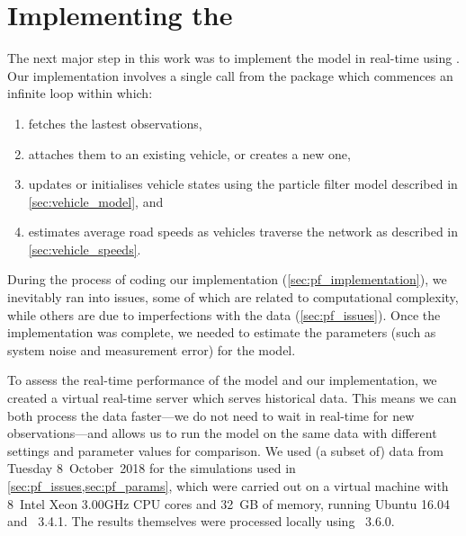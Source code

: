\section{Implementing the \rt{} \pf{}}
\label{sec:particle-filter}


The next major step in this work was to implement the model in real-time using \Cpp{}. Our implementation involves a single call from the \Rstats{} package  which commences an infinite loop within \Cpp{} which:
\begin{enumerate}
\item fetches the lastest observations,
\item attaches them to an existing vehicle, or creates a new one,
\item updates or initialises vehicle states using the particle filter model described in \cref{sec:vehicle_model}, and
\item estimates average road speeds as vehicles traverse the network as described in \cref{sec:vehicle_speeds}.
\end{enumerate}
During the process of coding our implementation (\cref{sec:pf_implementation}), we inevitably ran into issues, some of which are related to computational complexity, while others are due to imperfections with the data (\cref{sec:pf_issues}). Once the implementation was complete, we needed to estimate the parameters (such as system noise and measurement error) for the model.


To assess the real-time performance of the model and our \pf{} implementation, we created a virtual real-time server which serves historical data. This means we can both process the data faster---we do not need to wait in real-time for new observations---and allows us to run the model on the same data with different settings and parameter values for comparison. We used (a subset of) data from Tuesday 8~October~2018 for the simulations used in \cref{sec:pf_issues,sec:pf_params}, which were carried out on a virtual machine with 8~Intel Xeon 3.00GHz CPU cores and 32~GB of memory, running Ubuntu 16.04 and \Rstats{}~3.4.1. The results themselves were processed locally using \Rstates{}~3.6.0.









